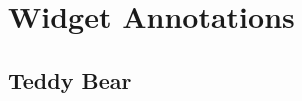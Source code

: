 \documentclass[a4paper]{article}
\begin{document}
\section*{Widget Annotations}
\subsection*{Teddy Bear}

 
\end{document}
